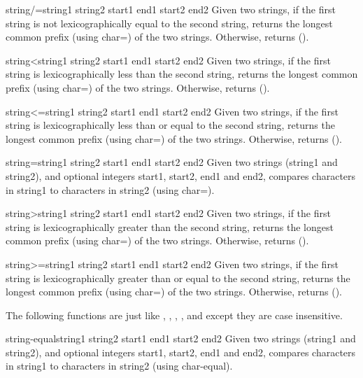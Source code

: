 \documentclass[10pt,english]{book}
\begin{document}
\begin{function}{string/=}{string1 string2 \key start1 end1 start2 end2}
  Given two strings, if the first string is not lexicographically equal
  to the second string, returns the longest common prefix (using char=)
  of the two strings. Otherwise, returns ().
\end{function}

\begin{function}{string<}{string1 string2 \key start1 end1 start2 end2}
  Given two strings, if the first string is lexicographically less than
  the second string, returns the longest common prefix (using char=)
  of the two strings. Otherwise, returns ().
\end{function}

\begin{function}{string<=}{string1 string2 \key start1 end1 start2 end2}
  Given two strings, if the first string is lexicographically less than
  or equal to the second string, returns the longest common prefix
  (using char=) of the two strings. Otherwise, returns ().
\end{function}

\begin{function}{string=}{string1 string2 \key start1 end1 start2 end2}
  Given two strings (string1 and string2), and optional integers start1,
  start2, end1 and end2, compares characters in string1 to characters in
  string2 (using char=).
\end{function}

\begin{function}{string>}{string1 string2 \key start1 end1 start2 end2}
  Given two strings, if the first string is lexicographically greater than
  the second string, returns the longest common prefix (using char=)
  of the two strings. Otherwise, returns ().
\end{function}

\begin{function}{string>=}{string1 string2 \key start1 end1 start2 end2}
  Given two strings, if the first string is lexicographically greater
  than or equal to the second string, returns the longest common prefix
  (using char=) of the two strings. Otherwise, returns ().
\end{function}

The following functions are just like , , ,
, and  except they are case insensitive.

\begin{function}{string-equal}{string1 string2 \key start1 end1 start2 end2}
  Given two strings (string1 and string2), and optional integers start1,
  start2, end1 and end2, compares characters in string1 to characters in
  string2 (using char-equal).
\end{function}
\end{document}
